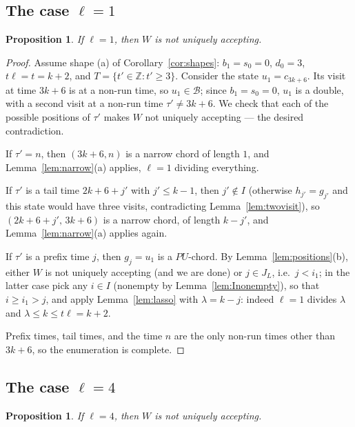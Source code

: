 \documentclass[11pt]{article}
\newtheorem{proposition}[theorem]{Proposition}
\theoremstyle{definition}
\newcommand{\Z}{\mathbb{Z}}
\begin{document}
\subsection{The case \texorpdfstring{$\ell=1$}{l=1}}

\begin{proposition}\label{prop:ell1}
If $\ell=1$, then $W$ is not uniquely accepting.
\end{proposition}

\begin{proof}
Assume shape (a) of Corollary~\ref{cor:shapes}: $b_1=s_0=0$, $d_0=3$,
$t\ell=t=k+2$, and $T=\{t'\in\Z:t'\ge3\}$. Consider the state
$u_1=c_{3k+6}$. Its visit at time $3k+6$ is at a non-run time, so
$u_1\in\mathcal B$; since $b_1=s_0=0$, $u_1$ is a double, with a second
visit at a non-run time $\tau'\ne 3k+6$. We check that each of the
possible positions of $\tau'$ makes $W$ not uniquely accepting --- the
desired contradiction.

If $\tau'=n$, then $(3k+6,n)$ is a narrow chord of length $1$, and
Lemma~\ref{lem:narrow}(a) applies, $\ell=1$ dividing everything.

If $\tau'$ is a tail time $2k+6+j'$ with $j'\le k-1$, then $j'\notin I$
(otherwise $h_{j'}=g_{j'}$ and this state would have three visits,
contradicting Lemma~\ref{lem:twovisit}), so $(2k+6+j',\,3k+6)$ is a narrow
chord, of length $k-j'$, and Lemma~\ref{lem:narrow}(a) applies again.

If $\tau'$ is a prefix time $j$, then $g_j=u_1$ is a $PU$-chord. By
Lemma~\ref{lem:positions}(b), either $W$ is not uniquely accepting (and we
are done) or $j\in J_L$, i.e.\ $j<i_1$; in the latter case pick any $i\in I$
(nonempty by Lemma~\ref{lem:Inonempty}), so that $i\ge i_1>j$, and apply
Lemma~\ref{lem:lasso} with $\lambda=k-j$: indeed $\ell=1$ divides
$\lambda$ and $\lambda\le k\le t\ell=k+2$.

Prefix times, tail times, and the time $n$ are the only non-run times other
than $3k+6$, so the enumeration is complete.
\end{proof}

\subsection{The case \texorpdfstring{$\ell=4$}{l=4}}

\begin{proposition}\label{prop:ell4}
If $\ell=4$, then $W$ is not uniquely accepting.
\end{proposition}
\end{document}
